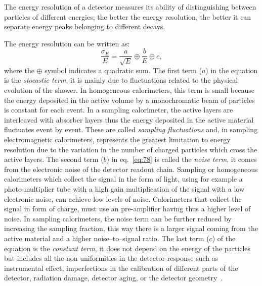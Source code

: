 The energy resolution of a detector measures its ability of distinguishing
between particles of different energies; the better the energy resolution, the
better it can separate energy peaks belonging to different decays.

The energy resolution can be written as:
\begin{equation}
  \label{eq:78}
  \frac{\sigma_E}{E} = \frac{a}{\sqrt{E}} \oplus \frac{b}{E} \oplus c,
\end{equation}
where the $\oplus$ symbol indicates a quadratic sum. The first term ($a$) in the
equation is the \emph{stocastic term}, it is mainly due to fluctuations related
to the physical evolution of the shower. In homogeneous calorimeters, this term
is small because the energy deposited in the active volume by a monochromatic
beam of particles is constant for each event. In a sampling calorimeter, the
active layers are interleaved with absorber layers thus the energy deposited in
the active material fluctuates event by event. These are called \emph{sampling
  fluctuations} and, in sampling electromagnetic calorimeters, represents the
greatest limitation to energy resolution due to the variation in the number of
charged particles which cross the active layers. The second term ($b$) in
eq.~\eqref{eq:78} is called the \emph{noise term}, it comes from the electronic
noise of the detector readout chain. Sampling or homogeneous calorimeters which
collect the signal in the form of light, using for example a photo-multiplier
tube with a high gain multiplication of the signal with a low electronic noise,
can achieve low levels of noise. Calorimeters that collect the signal in form of
charge, must use an pre-amplifier having thus a higher level of noise. In
sampling calorimeters, the noise term can be further reduced by increasing the
sampling fraction, this way there is a larger signal coming from the active
material and a higher noise--to--signal ratio. The last term ($c$) of the
equation is the \emph{constant term}, it does not depend on the energy of the
particles but includes all the non uniformities in the detector response such as
instrumental effect, imperfections in the calibration of different parts of the
detector, radiation damage, detector aging, or the detector
geometry~\cite{Calorimetry}.

